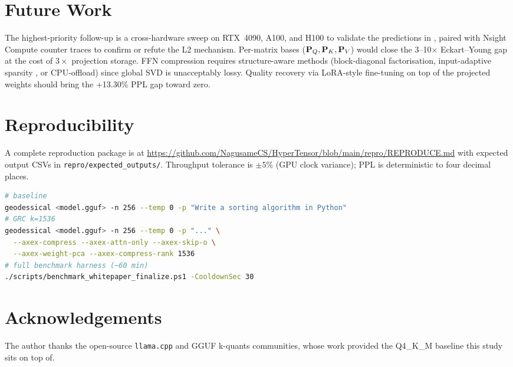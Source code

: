 \documentclass[11pt]{article}
\begin{document}
\section{Future Work}
\label{sec:future}
The highest-priority follow-up is a cross-hardware sweep on RTX~4090, A100,
and H100 to validate the predictions in , paired with
Nsight Compute counter traces to confirm or refute the L2 mechanism.
Per-matrix bases ($\mathbf{P}_Q,\mathbf{P}_K,\mathbf{P}_V$) would close the
3--10$\times$ Eckart--Young gap at the cost of $3\times$ projection storage.
FFN compression requires structure-aware methods (block-diagonal
factorisation, input-adaptive sparsity \cite{elhage2022superposition},
or CPU-offload) since global SVD is unacceptably lossy.  Quality recovery via
LoRA-style \cite{hu2021lora} fine-tuning on top of the projected weights
should bring the +13.30\% PPL gap toward zero.

\section{Reproducibility}
A complete reproduction package is at
\url{https://github.com/NagusameCS/HyperTensor/blob/main/repro/REPRODUCE.md}
with expected output CSVs in
\texttt{repro/expected\_outputs/}.  Throughput tolerance is $\pm 5\%$
(GPU clock variance); PPL is deterministic to four decimal places.

\begin{lstlisting}[language=bash,caption={Headline reproduction.}]
# baseline
geodessical <model.gguf> -n 256 --temp 0 -p "Write a sorting algorithm in Python"
# GRC k=1536
geodessical <model.gguf> -n 256 --temp 0 -p "..." \
  --axex-compress --axex-attn-only --axex-skip-o \
  --axex-weight-pca --axex-compress-rank 1536
# full benchmark harness (~60 min)
./scripts/benchmark_whitepaper_finalize.ps1 -CooldownSec 30
\end{lstlisting}

\section*{Acknowledgements}
The author thanks the open-source \texttt{llama.cpp} \cite{ggerganov2023gguf}
and GGUF k-quants \cite{ggerganov2023kquants} communities, whose work
provided the Q4\_K\_M baseline this study sits on top of.

\appendix
\end{document}
